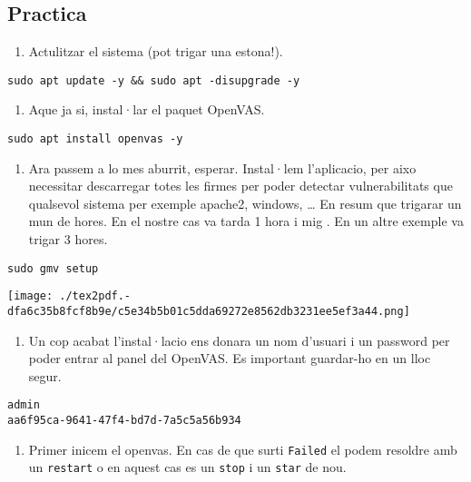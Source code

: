 \documentclass[]{article}
\providecommand{\tightlist}{%
  \setlength{\itemsep}{0pt}\setlength{\parskip}{0pt}}
\begin{document}
\hypertarget{practica}{%
\subsection{\texorpdfstring{\textbf{Practica}}{Practica}}\label{practica}}

\begin{enumerate}
\def\labelenumi{\arabic{enumi}.}
\tightlist
\item
  Actulitzar el sistema (pot trigar una estona!).
\end{enumerate}

\texttt{sudo\ apt\ update\ -y\ \&\&\ sudo\ apt\ -disupgrade\ -y}

\begin{enumerate}
\def\labelenumi{\arabic{enumi}.}
\setcounter{enumi}{1}
\tightlist
\item
  Aque ja si, instal·lar el paquet OpenVAS.
\end{enumerate}

\texttt{sudo\ apt\ install\ openvas\ -y}

\begin{enumerate}
\def\labelenumi{\arabic{enumi}.}
\setcounter{enumi}{2}
\tightlist
\item
  Ara passem a lo mes aburrit, esperar. Instal·lem l'aplicacio, per aixo
  necessitar descarregar totes les firmes per poder detectar
  vulnerabilitats que qualsevol sistema per exemple apache2, windows,
  \ldots{} En resum que trigarar un mun de hores. En el nostre cas va
  tarda 1 hora i mig . En un altre exemple va trigar 3 hores.
\end{enumerate}

\texttt{sudo\ gmv\ setup}

\texttt{[image: ./tex2pdf.-dfa6c35b8fcf8b9e/c5e34b5b01c5dda69272e8562db3231ee5ef3a44.png]}

\begin{enumerate}
\def\labelenumi{\arabic{enumi}.}
\setcounter{enumi}{3}
\tightlist
\item
  Un cop acabat l'instal·lacio ens donara un nom d'usuari i un password
  per poder entrar al panel del OpenVAS. Es important guardar-ho en un
  lloc segur.
\end{enumerate}

\begin{verbatim}
admin
aa6f95ca-9641-47f4-bd7d-7a5c5a56b934
\end{verbatim}

\begin{enumerate}
\def\labelenumi{\arabic{enumi}.}
\setcounter{enumi}{4}
\tightlist
\item
  Primer inicem el openvas. En cas de que surti \texttt{Failed} el podem
  resoldre amb un \texttt{restart} o en aquest cas es un \texttt{stop} i
  un \texttt{star} de nou.
\end{enumerate}
\end{document}
